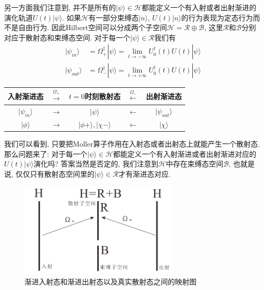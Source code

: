 \documentclass[a4paper,11pt]{book}
\begin{document}
另一方面我们注意到, 并不是所有的$|\psi\rangle\in\mathcal{H}$都能定义一个有入射或者出射渐进的演化轨道$U(t)|\psi\rangle$. 如果$\mathcal{H}$有一部分束缚态$|n\rangle$, $U(t)|n\rangle$的行为表现为定态行为而不是自由行为. 因此Hilbert空间可以分成两个子空间$\mathcal{H}=\mathcal{R}\oplus\mathcal{B}$, 这里$\mathcal{R}$和$\mathcal{B}$分别对应于散射态和束缚态空间. 对于每一个$|\psi\rangle\in\mathcal{R}$我们有
\begin{equation}
  \begin{split}
     |\psi_{in}\rangle&=\Omega_+^\dag|\psi\rangle=\lim_{t\to-\infty}U_0^\dag(t)U(t)|\psi\rangle\\
     |\psi_{out}\rangle&=\Omega_-^\dag|\psi\rangle=\lim_{t\to+\infty}U_0^\dag(t)U(t)|\psi\rangle
  \end{split}
\end{equation}
\begin{center}
\begin{tabular}{c c c c c}
  入射渐进态 & $\xrightarrow{\Omega_+}$ & $t=0$时刻散射态 & $\xleftarrow{\Omega_-}$ & 出射渐进态 \\
  \hline
  $|\psi_{in}\rangle$ & $\rightarrow$ & $|\psi\rangle$ & $\leftarrow$ & $|\psi_{out}\rangle$ \\
  $|\phi\rangle$ & $\rightarrow$ & $|\phi+\rangle,|\chi-\rangle$ & $\leftarrow$ & $|\chi\rangle$ \\
\end{tabular}
\end{center}

我们可以看到, 只要把Moller算子作用在入射态或者出射态上就能产生一个散射态. 那么问题来了: 对于每一个$|\psi\rangle\in\mathcal{H}$都能定义一个有入射渐进或者出射渐进对应的$U(t)|\psi\rangle$演化吗? 答案当然是否定的, 我们注意到$\mathcal{H}$中存在束缚态空间$\mathcal{B}$, 也就是说, 仅仅只有散射态空间里的$|\psi\rangle\in\mathcal{R}$才有渐进态对应.
\begin{figure}[H]
  \centering
  \includegraphics[width=3in]{fig11.pdf}
  \caption{渐进入射态和渐进出射态以及真实散射态之间的映射图}\label{fig11}
\end{figure}
\end{document}

